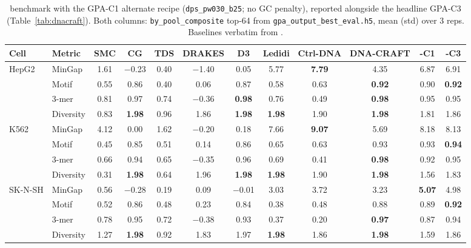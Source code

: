 \begin{table}[h]
\caption{\dnacraft{} benchmark with the GPA-C1 alternate recipe (\texttt{dps\_pw030\_b25}; no GC penalty), reported alongside the headline GPA-C3 (Table~\ref{tab:dnacraft}). Both columns: \texttt{by\_pool\_composite} top-64 from \texttt{gpa\_output\_best\_eval.h5}, mean (std) over 3 reps. Baselines verbatim from \citet{dnacraft2026}.}
\label{tab:dnacraft_full_eval}
\centering
\scriptsize
\begin{tabular}{llcccccccccc}
\toprule
Cell & Metric & SMC & CG & TDS & DRAKES & D3 & Ledidi & Ctrl-DNA & DNA-CRAFT & \gpa{}-C1 & \gpa{}-C3 \\
\midrule
\multirow{4}{*}{HepG2}
 & MinGap   & 1.61 & $-$0.23 & 0.40 & $-$1.40 & 0.05 & 5.77 & \textbf{7.79} & 4.35 & 6.87 & 6.91 \\
 & Motif    & 0.55 & 0.86 & 0.40 & 0.06 & 0.87 & 0.58 & 0.63 & \textbf{0.92} & 0.90 & \textbf{0.92} \\
 & 3-mer    & 0.81 & 0.97 & 0.74 & $-$0.36 & \textbf{0.98} & 0.76 & 0.49 & \textbf{0.98} & 0.95 & 0.95 \\
 & Diversity& 0.83 & \textbf{1.98} & 0.96 & 1.86 & \textbf{1.98} & \textbf{1.98} & 1.90 & \textbf{1.98} & 1.81 & 1.86 \\
\midrule
\multirow{4}{*}{K562}
 & MinGap   & 4.12 & 0.00 & 1.62 & $-$0.20 & 0.18 & 7.66 & \textbf{9.07} & 5.69 & 8.18 & 8.13 \\
 & Motif    & 0.45 & 0.85 & 0.51 & 0.14 & 0.86 & 0.65 & 0.63 & 0.93 & 0.93 & \textbf{0.94} \\
 & 3-mer    & 0.66 & 0.94 & 0.65 & $-$0.35 & 0.96 & 0.69 & 0.41 & \textbf{0.98} & 0.92 & 0.95 \\
 & Diversity& 0.31 & \textbf{1.98} & 0.64 & 1.96 & \textbf{1.98} & \textbf{1.98} & 1.90 & \textbf{1.98} & 1.56 & 1.83 \\
\midrule
\multirow{4}{*}{SK-N-SH}
 & MinGap   & 0.56 & $-$0.28 & 0.19 & 0.09 & $-$0.01 & 3.03 & 3.72 & 3.23 & \textbf{5.07} & 4.98 \\
 & Motif    & 0.52 & 0.86 & 0.48 & 0.23 & 0.84 & 0.38 & 0.48 & 0.88 & 0.89 & \textbf{0.92} \\
 & 3-mer    & 0.78 & 0.95 & 0.72 & $-$0.38 & 0.93 & 0.37 & 0.20 & \textbf{0.97} & 0.87 & 0.94 \\
 & Diversity& 1.27 & \textbf{1.98} & 0.92 & 1.83 & 1.97 & \textbf{1.98} & 1.86 & \textbf{1.98} & 1.59 & 1.86 \\
\bottomrule
\end{tabular}
\end{table}

